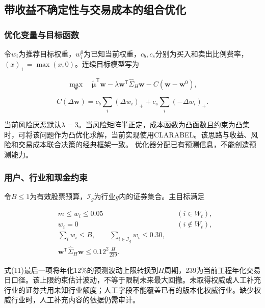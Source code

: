 \documentclass[UTF8,12pt,a4paper,fontset=none]{ctexart}
\begin{document}
\subsection{带收益不确定性与交易成本的组合优化}

\subsubsection{优化变量与目标函数}

令$w_i$为推荐目标权重，$w_i^0$为已知当前权重，$c_b,c_s$分别为买入和卖出比例费率，$(x)_+=\max(x,0)$。连续目标模型写为


\begin{equation}
 \max_{\boldsymbol w}\quad \widetilde{\boldsymbol\mu}^{\mathsf T}\boldsymbol w-\lambda\boldsymbol w^{\mathsf T}\widehat\Sigma_H\boldsymbol w-C(\boldsymbol w-\boldsymbol w^0), \tag{9}
\end{equation}

\begin{equation}
 C(\Delta\boldsymbol w)=c_b\sum_i(\Delta w_i)_++c_s\sum_i(-\Delta w_i)_+. \tag{10}
\end{equation}

当前风险厌恶默认$\lambda=3$。当风险矩阵半正定，成本函数为凸函数且约束为凸集时，可将该问题作为凸优化求解，当前实现使用CLARABEL。该思路与收益、风险和交易成本联合决策的经典框架一致。\cite{r3} 优化器分配已有预测信息，不能创造预测能力。


\subsubsection{用户、行业和现金约束}

令$B\leq1$为有效股票预算，$\mathcal I_g$为行业$g$内的证券集合。主目标满足


\begin{equation}
 \begin{aligned}
 &m\leq w_i\leq0.05 &&(i\in W_t),\\
 &w_i=0 &&(i\notin W_t),\\
 &\sum_i w_i\leq B,\qquad \sum_{i\in\mathcal I_g}w_i\leq0.30,\\
 &\boldsymbol w^{\mathsf T}\widehat\Sigma_H\boldsymbol w\leq0.12^2\frac{H}{239}.
 \end{aligned} \tag{11}
\end{equation}

式(11)最后一项将年化12\%的预测波动上限转换到$H$周期，239为当前工程年化交易日口径。该上限约束估计波动，不等于限制未来最大回撤。未取得权威或人工补充行业的证券共用未知行业额度；人工字段不能覆盖已有的版本化权威行业。缺少权威行业时，人工补充内容的依据仍需审计。
\end{document}
